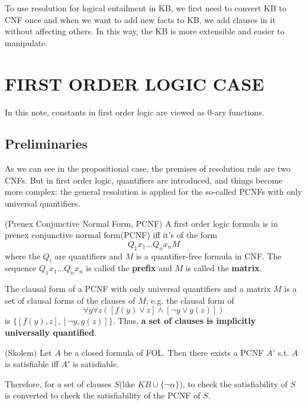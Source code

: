 \documentclass{article}
\begin{document}
\noindent To use resolution for logical entailment in KB, we first need to convert KB to CNF once and when we want to add new facts to KB, we add clauses in it without affecting others. In this way, the KB is more extensible and easier to manipulate. 

\section{FIRST ORDER LOGIC CASE}
In this note, constants in first order logic are viewed as 0-ary functions. 
\subsection{Preliminaries}
As we can see in the propositional case, the premises of resolution rule are two CNFs.  But in first order logic, quantifiers are introduced, and things become more complex: the general resolution is applied for the so-called PCNFs with only universal quantifiers.\newline

\begin{defin}(Prenex Conjunctive Normal Form, PCNF)\newline
A first order logic formula is in prenex conjunctive normal form(PCNF) iff it's of the form
\[
Q_1x_1 \dots Q_n x_n M
\]
where the $Q_i$ are quantifiers and $M$ is a quantifier-free formula in CNF. The sequence $Q_1x_1 \dots  Q_nx_n$ is called the \textbf{prefix} and $M$ is called the \textbf{matrix}.
\end{defin}

\noindent The clausal form of a PCNF  with only universal quantifiers and a matrix $M$ is a set of clausal forms of the clauses of $M$; e.g. the clausal form of 
\[
\forall y \forall z([f(y) \lor z] \wedge [\neg y \vee g(z)])
\]
is $\{[f(y),z],[\neg y,g(z)]\}$. Thus, \textbf{a set of clauses is implicitly universally quantified}. 

\begin{theo}(Skolem)\newline
Let $A$ be a closed formula of FOL. Then there exists a PCNF $A'$ s.t. $A$ is satisfiable iff $A'$ is satisfiable.
\end{theo}
\noindent Therefore, for a set of clauses $S$(like $KB \cup \{\neg \alpha\}$), to check the satisfiability of $S$ is converted to check the satisfiability of the PCNF of $S$. \newline
\end{document}

